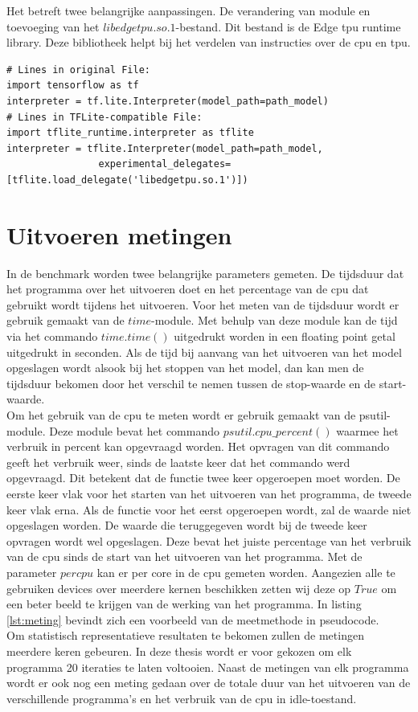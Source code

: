 		Het betreft twee belangrijke aanpassingen. De verandering van module en toevoeging van het $libedgetpu.so.1$-bestand. Dit bestand is de Edge \gls{tpu} runtime library. Deze bibliotheek helpt bij het verdelen van instructies over de \gls{cpu} en \gls{tpu}. 

	\begin{lstlisting}[caption={Converteren naar een \gls{tfl}-programma.}, captionpos=b,label={lst:TFLconversieprogram}]
# Lines in original File:
import tensorflow as tf
interpreter = tf.lite.Interpreter(model_path=path_model)
# Lines in TFLite-compatible File:
import tflite_runtime.interpreter as tflite
interpreter = tflite.Interpreter(model_path=path_model,
				experimental_delegates=[tflite.load_delegate('libedgetpu.so.1')])
	\end{lstlisting}	

		
\section{Uitvoeren metingen}

	In de benchmark worden twee belangrijke parameters gemeten. De tijdsduur dat het programma over het uitvoeren doet en het percentage van de \gls{cpu} dat gebruikt wordt tijdens het uitvoeren. Voor het meten van de tijdsduur wordt er gebruik gemaakt van de $time$-module. Met behulp van deze module kan de tijd via het commando $time.time()$ uitgedrukt worden in een floating point getal uitgedrukt in seconden. Als de tijd bij aanvang van het uitvoeren van het model opgeslagen wordt alsook bij het stoppen van het model, dan kan men de tijdsduur bekomen door het verschil te nemen tussen de stop-waarde en de start-waarde.\\
	Om het gebruik van de \gls{cpu} te meten wordt er gebruik gemaakt van de psutil-module. Deze module bevat het commando $psutil.cpu\_percent()$ waarmee het verbruik in percent kan opgevraagd worden. Het opvragen van dit commando geeft het verbruik weer, sinds de laatste keer dat het commando werd opgevraagd. Dit betekent dat de functie twee keer opgeroepen moet worden. De eerste keer vlak voor het starten van het uitvoeren van het programma, de tweede keer vlak erna. Als de functie voor het eerst opgeroepen wordt, zal de waarde niet opgeslagen worden. De waarde die teruggegeven wordt bij de tweede keer opvragen wordt wel opgeslagen. Deze bevat het juiste percentage van het verbruik van de \gls{cpu} sinds de start van het uitvoeren van het programma. Met de parameter $percpu$ kan er per core in de \gls{cpu} gemeten worden. Aangezien alle te gebruiken devices over meerdere kernen beschikken zetten wij deze op $True$ om een beter beeld te krijgen van de werking van het programma. In listing \ref{lst:meting} bevindt zich een voorbeeld van de meetmethode in pseudocode.\\
	Om statistisch representatieve resultaten te bekomen zullen de metingen meerdere keren gebeuren. In deze thesis wordt er voor gekozen om elk programma 20 iteraties te laten voltooien. Naast de metingen van elk programma wordt er ook nog een meting gedaan over de totale duur van het uitvoeren van de verschillende programma's en het verbruik van de \gls{cpu} in idle-toestand.


